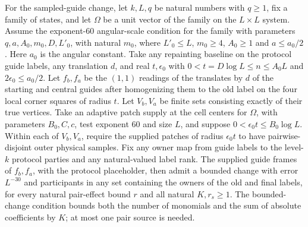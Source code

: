 \begin{lemma}
    \label{thm:peps_protocol_central_birth_change}
    \leanok
    For the sampled-guide change, let $k,L,q$ be natural numbers with $q\ge1$,
    fix a family of states, and let $\Omega$ be a unit vector of the family on
    the $L\times L$ system. Assume the exponent-$60$ angular-scale condition
    for the family with parameters $q,a,A_0,m_0,D,L'_0$, with natural $m_0$, where
    $L'_0\le L$, $m_0\ge4$, $A_0\ge1$ and $a\le a_0/2$.
    Here $a_0$ is the angular constant. Take any repainting baseline on the
    protocol guide labels, any translation $d$, and real $t,\epsilon_0$ with
    $0<t=D\log L\le n\le A_0L$ and $2\epsilon_0\le a_0/2$.
    Let $f_b,f_a$ be the $(1,1)$ readings of the translates by $d$ of the
    starting and central guides after homogenizing them to the old label on
    the four local corner squares of radius $t$. Let $V_b,V_a$ be finite sets
    consisting exactly of their true vertices. Take an adaptive patch supply at the cell centers for
    $\Omega$, with parameters $B_0,C,c$, test exponent $60$ and size $L$,
    and suppose $0<\epsilon_0t\le B_0\log L$. Within each of $V_b,V_a$,
    require the supplied patches of radius $\epsilon_0t$ to have
    pairwise-disjoint outer physical samples. Fix any owner map from guide
    labels to the level-$k$ protocol parties and any natural-valued label rank.
    The supplied guide frames of $f_b,f_a$, with the protocol placeholder,
    then admit a bounded change with error $L^{-30}$ and participants in
    any set containing the owners of the old and final labels, for every
    natural pair-effect bound $r$ and all natural $K,r_s\ge1$. The bounded-change
    condition bounds both the number of monomials and the sum of absolute
    coefficients by $K$; at most one pair source is needed.


\end{lemma}
